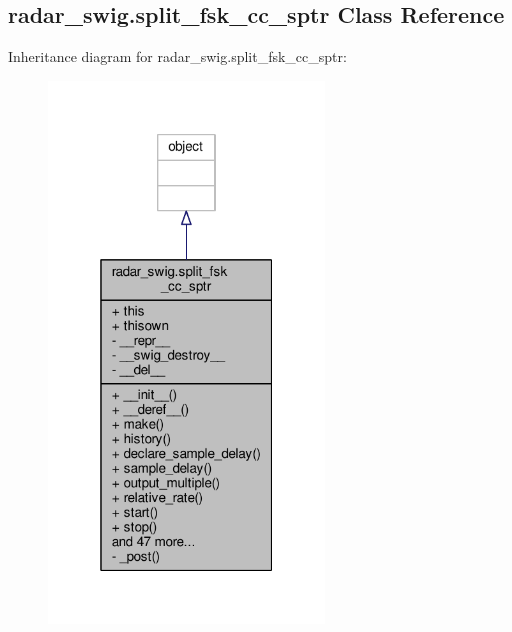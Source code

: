 \subsection{radar\+\_\+swig.\+split\+\_\+fsk\+\_\+cc\+\_\+sptr Class Reference}
\label{classradar__swig_1_1split__fsk__cc__sptr}


Inheritance diagram for radar\+\_\+swig.\+split\+\_\+fsk\+\_\+cc\+\_\+sptr\+:
\nopagebreak
\begin{figure}[H]
\begin{center}
\leavevmode
\includegraphics[width=208pt]{d4/d25/classradar__swig_1_1split__fsk__cc__sptr__inherit__graph}
\end{center}
\end{figure}


